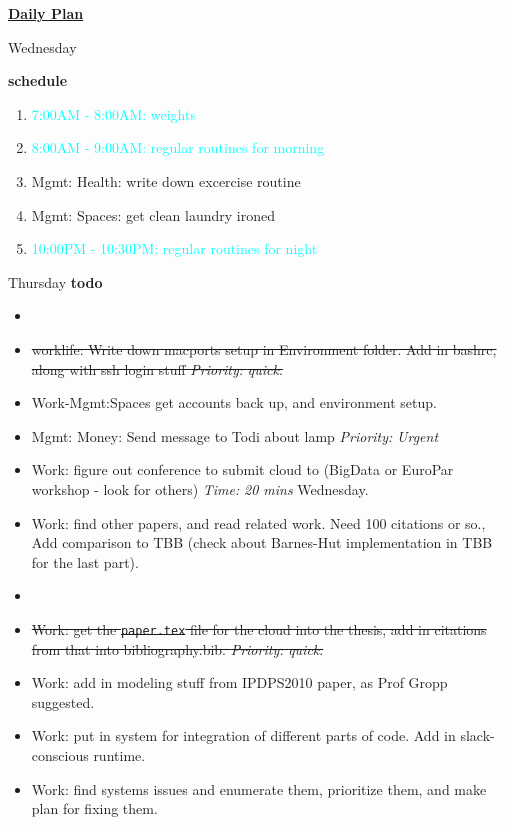 \documentclass[serif,mathserif,final]{beamer}
\newcommand{\doneTask}[1]{\item \sout{#1}}
\newcommand{\timeEst}[1]{\textit{Time:} \textit{#1}}
\newcommand{\priority}[1]{\textit{Priority:} \textit{#1}}
\newcommand{\regItem}[1]{\item \textcolor{cyan}{#1}}
\newcommand{\deadline}[1]{#1}
\begin{document}
\begin{frame}{}
\begin{columns}[t]
\begin{column}{0.33\linewidth}{\textbf{\underline{Daily Plan}}}
{\begin{block} {\small Wednesday}
\begin{itemize}
  \end{itemize} 

\textbf{schedule} \\
  \begin{enumerate} 
    \regItem{7:00AM - 8:00AM: weights}
    \regItem{8:00AM - 9:00AM: regular routines for morning}
  \item \tiny Mgmt: Health: write down excercise routine 
  \item \tiny Mgmt: Spaces: get clean laundry ironed
    \regItem{10:00PM - 10:30PM: regular routines for night}
  \end{enumerate} 
\end{block} 

\begin{block}{\small Thursday} 
\textbf{todo} \\
\begin{itemize} 

\item \tiny \doneTask{worklife: Write down macports setup in Environment folder. Add in bashrc, along with ssh login stuff \priority{quick}.} 
\item \tiny Work-Mgmt:Spaces get accounts back up, and environment setup. 
\item \tiny Mgmt: Money: Send message to Todi about lamp \priority {Urgent} 

\item \tiny Work: figure out conference to submit cloud to (BigData or EuroPar workshop - look for others) \timeEst{20 mins} \deadline{Wednesday}. 

\item \tiny Work: find other papers, and read related work. Need 100 citations or so., Add comparison to TBB (check about Barnes-Hut implementation in TBB for the last part). 

\item \tiny \doneTask{Work: get the \texttt{paper.tex} file for the cloud into the thesis, 
  add in citations from that into bibliography.bib. \priority{quick}.} 

\item \tiny Work: add in modeling stuff from IPDPS2010 paper, as Prof Gropp suggested. 

\item \tiny Work: put in system for integration of different parts of code. Add in slack-conscious runtime. 

\item \tiny Work: find systems issues and enumerate them, prioritize them, and make plan for fixing them. 


\end{itemize}
\end{block}}
\end{column}
\end{columns}
\end{frame}
\end{document}
